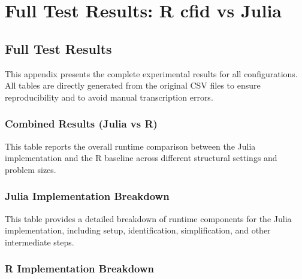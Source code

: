 \documentclass[a4paper]{report}
\begin{document}
\chapter{Full Test Results: R cfid vs Julia}
\label{app:test_result}
\section{Full Test Results}

This appendix presents the complete experimental results for all configurations.
All tables are directly generated from the original CSV files to ensure reproducibility
and to avoid manual transcription errors.

\subsection{Combined Results (Julia vs R)}

This table reports the overall runtime comparison between the Julia implementation
and the R baseline across different structural settings and problem sizes.

\begin{center}
\end{center}

\subsection{Julia Implementation Breakdown}

This table provides a detailed breakdown of runtime components for the Julia implementation,
including setup, identification, simplification, and other intermediate steps.

\begin{center}
\end{center}

\subsection{R Implementation Breakdown}
\end{document}
